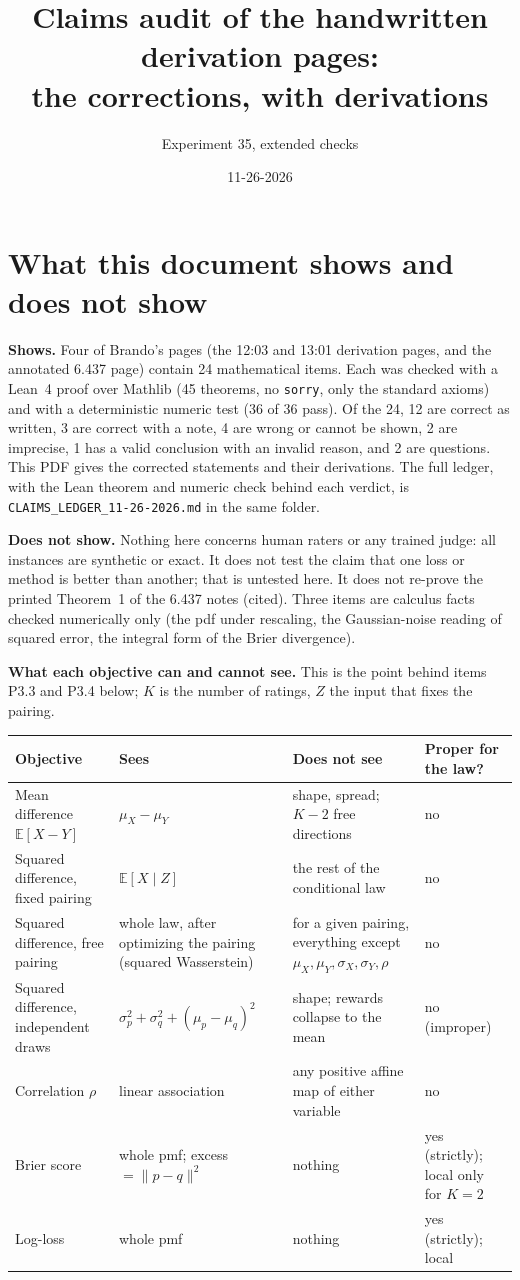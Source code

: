 \documentclass[11pt]{article}
\title{Claims audit of the handwritten derivation pages:\\ the corrections, with derivations}
\author{Experiment 35, extended checks}
\date{11-26-2026}
\newcommand{\E}{\mathbb{E}}
\begin{document}
\maketitle

\section*{What this document shows and does not show}

\textbf{Shows.} Four of Brando's pages (the 12:03 and 13:01 derivation pages, and the annotated 6.437 page) contain 24 mathematical items. Each was checked with a Lean~4 proof over Mathlib (45 theorems, no \texttt{sorry}, only the standard axioms) and with a deterministic numeric test (36 of 36 pass). Of the 24, 12 are correct as written, 3 are correct with a note, 4 are wrong or cannot be shown, 2 are imprecise, 1 has a valid conclusion with an invalid reason, and 2 are questions. This PDF gives the corrected statements and their derivations. The full ledger, with the Lean theorem and numeric check behind each verdict, is \texttt{CLAIMS\_LEDGER\_11-26-2026.md} in the same folder.

\textbf{Does not show.} Nothing here concerns human raters or any trained judge: all instances are synthetic or exact. It does not test the claim that one loss or method is better than another; that is untested here. It does not re-prove the printed Theorem~1 of the 6.437 notes (cited). Three items are calculus facts checked numerically only (the pdf under rescaling, the Gaussian-noise reading of squared error, the integral form of the Brier divergence).

\textbf{What each objective can and cannot see.} This is the point behind items P3.3 and P3.4 below; $K$ is the number of ratings, $Z$ the input that fixes the pairing.

\begin{center}
\small
\begin{tabular}{@{}L{3.3cm}L{4.6cm}L{4.6cm}L{2.4cm}@{}}
\toprule
Objective & Sees & Does not see & Proper for the law? \\
\midrule
Mean difference $\E[X-Y]$ & $\mu_X-\mu_Y$ & shape, spread; $K-2$ free directions & no \\
Squared difference, fixed pairing & $\E[X\mid Z]$ & the rest of the conditional law & no \\
Squared difference, free pairing & whole law, after optimizing the pairing (squared Wasserstein) & for a given pairing, everything except $\mu_X,\mu_Y,\sigma_X,\sigma_Y,\rho$ & no \\
Squared difference, independent draws & $\sigma_p^2+\sigma_q^2+(\mu_p-\mu_q)^2$ & shape; rewards collapse to the mean & no (improper) \\
Correlation $\rho$ & linear association & any positive affine map of either variable & no \\
Brier score & whole pmf; excess $=\lVert p-q\rVert^2$ & nothing & yes (strictly); local only for $K=2$ \\
Log-loss & whole pmf & nothing & yes (strictly); local \\
\bottomrule
\end{tabular}
\end{center}
\end{document}
